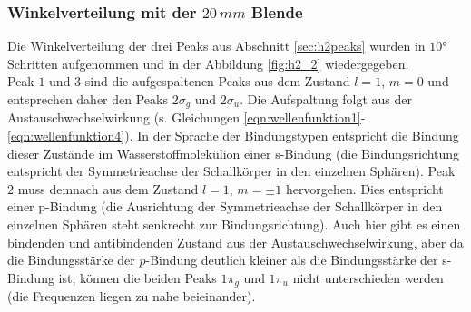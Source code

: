 \subsubsection{Winkelverteilung mit der $20 \, mm$ Blende}
Die Winkelverteilung der drei Peaks aus Abschnitt \ref{sec:h2peaks} wurden in $10°$ Schritten aufgenommen und in der Abbildung \ref{fig:h2_2} wiedergegeben. \\
Peak $1$ und $3$ sind die aufgespaltenen Peaks aus dem Zustand $l=1$, $m=0$ und entsprechen daher den Peaks $2\sigma_g$ und $2\sigma_u$. Die Aufspaltung folgt aus der Austauschwechselwirkung (s. Gleichungen \ref{eqn:wellenfunktion1}-\ref{eqn:wellenfunktion4}). In der Sprache der Bindungstypen entspricht die Bindung dieser Zustände im Wasserstoffmolekülion einer s-Bindung (die Bindungsrichtung entspricht der Symmetrieachse der Schallkörper in den einzelnen Sphären).
Peak $2$ muss demnach aus dem Zustand $l=1$, $m=\pm 1$ hervorgehen. Dies entspricht einer p-Bindung (die Ausrichtung der Symmetrieachse der Schallkörper in den einzelnen Sphären steht senkrecht zur Bindungsrichtung). Auch hier gibt es einen bindenden und antibindenden Zustand aus der Austauschwechselwirkung, aber da die Bindungsstärke der $p$-Bindung deutlich kleiner als die Bindungsstärke der s-Bindung ist, können die beiden Peaks $1\pi_g$ und $1\pi_u$ nicht unterschieden werden (die Frequenzen liegen zu nahe beieinander). 

